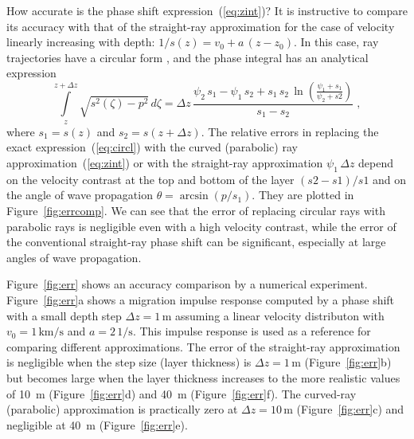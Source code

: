 How accurate is the phase shift expression~(\ref{eq:zint})? It is instructive
to compare its accuracy with that of the straight-ray approximation for the
case of velocity linearly increasing with depth: $1/s(z)=v_0+a\,(z-z_0)$. In
this case, ray trajectories have a circular form \cite[]{GEO01-01-00090022}, and
the phase integral has an analytical expression
\begin{equation}
\int\limits_{z}^{z+\Delta z} \sqrt{s^2(\zeta)-p^2}\,d \zeta =
\Delta z\,\frac{\psi_2\,s_1 - \psi_1\,s_2+
  s_1\,s_2\,\ln{\left(\frac{\psi_1+s_1}{\psi_2+s2}\right)}}{s_1-s_2}\;,
\label{eq:circl}
\end{equation}
where $s_1 = s(z)$ and $s_2=s(z+\Delta z)$. The relative errors in replacing
the exact expression~(\ref{eq:circl}) with the curved (parabolic) ray
approximation~(\ref{eq:zint}) or with the straight-ray approximation
$\psi_1\,\Delta z$ depend on the velocity contrast at the top and bottom of
the layer $(s2-s1)/s1$ and on the angle of wave propagation $\theta =
\arcsin{(p/s_1)}$. They are plotted in Figure~\ref{fig:errcomp}. We can see
that the error of replacing circular rays with parabolic rays is negligible
even with a high velocity contrast, while the error of the conventional
straight-ray phase shift can be significant, especially at large angles of
wave propagation.



Figure~\ref{fig:err} shows an accuracy comparison by a numerical experiment.
Figure~\ref{fig:err}a shows a migration impulse response computed by a phase
shift with a small depth step $\Delta z = 1\,\mbox{m}$ assuming a linear
velocity distributon with $v_0 = 1\,\mbox{km/s}$ and $a=2\,\mbox{1/s}$. This
impulse response is used as a reference for comparing different
approximations. The error of the straight-ray approximation is negligible when
the step size (layer thickness) is $\Delta z = 1\,\mbox{m}$
(Figure~\ref{fig:err}b) but becomes large when the layer thickness increases
to the more realistic values of 10~m (Figure~\ref{fig:err}d) and 40~m
(Figure~\ref{fig:err}f). The curved-ray (parabolic) approximation is
practically zero at $\Delta z = 10\,\mbox{m}$ (Figure~\ref{fig:err}c) and
negligible at 40~m (Figure~\ref{fig:err}e).

